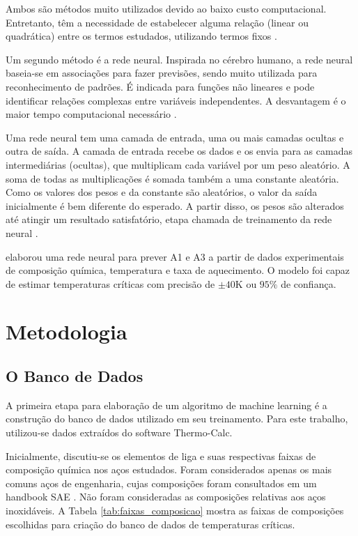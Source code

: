 \documentclass[brazil,tese,epusp]{usp}
\begin{document}
Ambos são métodos muito utilizados devido ao baixo custo computacional. Entretanto, têm a necessidade de estabelecer alguma relação (linear ou quadrática) entre os termos estudados, utilizando termos fixos \cite{Bhadeshia1999}.

Um segundo método é a rede neural. Inspirada no cérebro humano, a rede neural baseia-se em associações para fazer previsões, sendo muito utilizada para reconhecimento de padrões. É indicada para funções não lineares e pode identificar relações complexas entre variáveis independentes. A desvantagem é o maior tempo computacional necessário \cite{Belisle2015}.

Uma rede neural tem uma camada de entrada, uma ou mais camadas ocultas e outra de saída. A camada de entrada recebe os dados e os envia para as camadas intermediárias (ocultas), que multiplicam cada variável por um peso aleatório. A soma de todas as multiplicações é somada também a uma constante aleatória. Como os valores dos pesos e da constante são aleatórios, o valor da saída inicialmente é bem diferente do esperado. A partir disso, os pesos são alterados até atingir um resultado satisfatório, etapa chamada de treinamento da rede neural \cite{Bhadeshia1999}.

 elaborou uma rede neural para prever A1 e A3 a partir de dados experimentais de composição química, temperatura e taxa de aquecimento. O modelo foi capaz de estimar temperaturas críticas com precisão de $\pm 40$K ou $95\%$ de confiança.

\chapter{Metodologia}

\section{O Banco de Dados}

\label{sec:banco_dados}

A primeira etapa para elaboração de um algoritmo de machine learning é a construção do banco de dados utilizado em seu treinamento. Para este trabalho, utilizou-se dados extraídos do software Thermo-Calc\textregistered{}.

Inicialmente, discutiu-se os elementos de liga e suas respectivas faixas de composição química nos aços estudados. Foram considerados apenas os mais comuns aços de engenharia, cujas composições foram consultados em um handbook SAE \cite{SAE1983}. Não foram consideradas as composições relativas aos aços inoxidáveis. A Tabela \ref{tab:faixas_composicao} mostra as faixas de composições escolhidas para criação do banco de dados de temperaturas críticas.
\end{document}
